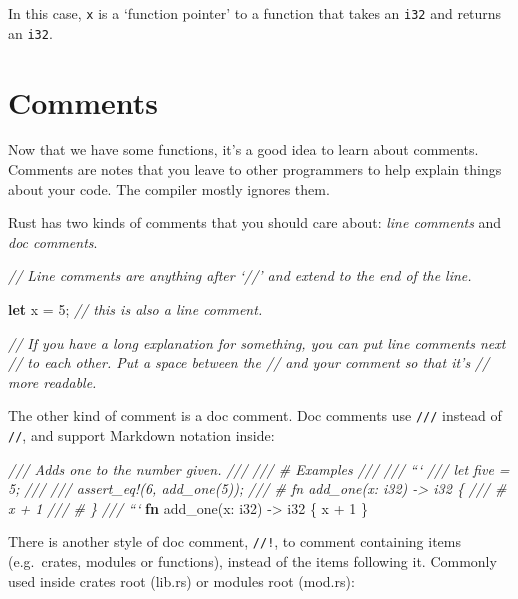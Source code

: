 \documentclass[a4paper,]{book}
\newenvironment{Shaded}{\begin{snugshade}}{\end{snugshade}}
\newcommand{\KeywordTok}[1]{\textcolor[rgb]{0.13,0.29,0.53}{\textbf{{#1}}}}
\newcommand{\DataTypeTok}[1]{\textcolor[rgb]{0.13,0.29,0.53}{{#1}}}
\newcommand{\DecValTok}[1]{\textcolor[rgb]{0.00,0.00,0.81}{{#1}}}
\newcommand{\CommentTok}[1]{\textcolor[rgb]{0.56,0.35,0.01}{\textit{{#1}}}}
\newcommand{\NormalTok}[1]{{#1}}
\begin{document}
In this case, \texttt{x} is a `function pointer' to a function that
takes an \texttt{i32} and returns an \texttt{i32}.

\hypertarget{sec--comments}{\section{Comments}\label{sec--comments}}

Now that we have some functions, it's a good idea to learn about
comments. Comments are notes that you leave to other programmers to help
explain things about your code. The compiler mostly ignores them.

Rust has two kinds of comments that you should care about: \emph{line
comments} and \emph{doc comments}.

\begin{Shaded}
\begin{Highlighting}[]
\CommentTok{// Line comments are anything after ‘//’ and extend to the end of the line.}

\KeywordTok{let} \NormalTok{x = }\DecValTok{5}\NormalTok{; }\CommentTok{// this is also a line comment.}

\CommentTok{// If you have a long explanation for something, you can put line comments next}
\CommentTok{// to each other. Put a space between the // and your comment so that it’s}
\CommentTok{// more readable.}
\end{Highlighting}
\end{Shaded}

The other kind of comment is a doc comment. Doc comments use
\texttt{///} instead of \texttt{//}, and support Markdown notation
inside:

\begin{Shaded}
\begin{Highlighting}[]
\CommentTok{/// Adds one to the number given.}
\CommentTok{///}
\CommentTok{/// # Examples}
\CommentTok{///}
\CommentTok{/// ```}
\CommentTok{/// let five = 5;}
\CommentTok{///}
\CommentTok{/// assert_eq!(6, add_one(5));}
\CommentTok{/// # fn add_one(x: i32) -> i32 \{}
\CommentTok{/// #     x + 1}
\CommentTok{/// # \}}
\CommentTok{/// ```}
\KeywordTok{fn} \NormalTok{add_one(x: }\DataTypeTok{i32}\NormalTok{) -> }\DataTypeTok{i32} \NormalTok{\{}
    \NormalTok{x + }\DecValTok{1}
\NormalTok{\}}
\end{Highlighting}
\end{Shaded}

There is another style of doc comment, \texttt{//!}, to comment
containing items (e.g.~crates, modules or functions), instead of the
items following it. Commonly used inside crates root (lib.rs) or modules
root (mod.rs):
\end{document}
